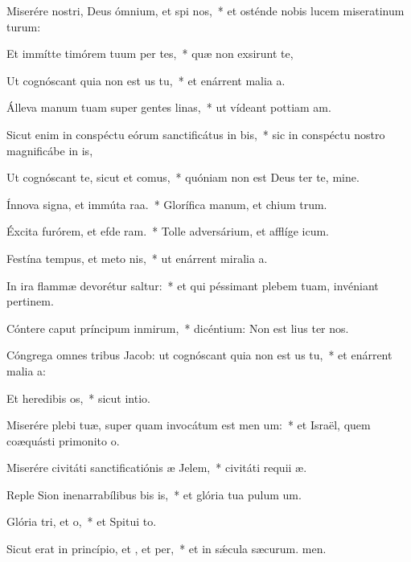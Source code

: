 \item Miserére nostri, Deus ómnium, et spi nos,~* et osténde nobis lucem miseratinum turum:
\item Et immítte timórem tuum per tes,~* quæ non exsirunt te,
\item Ut cognóscant quia non est us  tu,~* et enárrent malia a.
\item Álleva manum tuam super gentes linas,~* ut vídeant pottiam am.
\item Sicut enim in conspéctu eórum sanctificátus  in bis,~* sic in conspéctu nostro magnificábe in is,
\item Ut cognóscant te, sicut et  comus,~* quóniam non est Deus ter te, mine.
\item Ínnova signa, et immúta raa.~* Glorífica manum, et chium trum.
\item Éxcita furórem, et efde ram.~* Tolle adversárium, et afflíge icum.
\item Festína tempus, et meto nis,~* ut enárrent miralia a.
\item In ira flammæ devorétur  saltur:~* et qui péssimant plebem tuam, invéniant pertinem.
\item Cóntere caput príncipum inmirum,~* dicéntium: Non est lius ter nos.
\item Cóngrega omnes tribus Jacob: ut cognóscant quia non est us  tu,~* et enárrent malia a:
\item Et heredibis os,~* sicut  intio.
\item Miserére plebi tuæ, super quam invocátum est men um:~* et Israël, quem coæquásti primonito o.
\item Miserére civitáti sanctificatiónis æ Jelem,~* civitáti requii æ.
\item Reple Sion inenarrabílibus bis is,~* et glória tua pulum um.
\item Glória tri, et o,~* et Spitui to.
\item Sicut erat in princípio, et , et per,~* et in sǽcula sæcurum. men.
